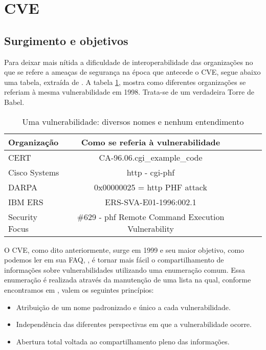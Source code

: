 	\section{CVE}
	\label{sec:cve}

		\subsection{Surgimento e objetivos}
			Para deixar mais nítida a dificuldade de interoperabilidade
			das organizações no que se refere a ameaças de segurança na época
			que antecede o CVE, segue abaixo uma tabela, extraída de \cite{Martin2001}.
			A tabela \ref{tab:torre_babel}, mostra
			como diferentes organizações se referiam à mesma vulnerabilidade
			em 1998. Trata-se de um verdadeira Torre de Babel.

			\begin{table}
				\begin{tabular}{|l|c|c|c|c|}
					\hline
						\textbf{Organização} & \textbf{Como se referia à vulnerabilidade}\\
					\hline
						CERT\footnotemark[1] & CA-96.06.cgi\_example\_code\\
					\hline
						Cisco Systems\footnotemark[2] & http - cgi-phf\\
					\hline
						DARPA & 0x00000025 = http PHF attack\\	
					\hline
						IBM ERS & ERS-SVA-E01-1996:002.1\\	
					\hline
						Security Focus\footnotemark[3] & \#629 - phf Remote Command Execution Vulnerability\\	
					\hline
				\end{tabular}
				\caption{Uma vulnerabilidade: diversos nomes e nenhum entendimento}\label{tab:torre_babel}
			\end{table}
			

			O CVE, como dito anteriormente, surge em 1999 e seu maior objetivo, como podemos
			ler em sua FAQ, \cite{CVE2010}, é tornar mais fácil
			o compartilhamento de informações sobre vulnerabilidades utilizando uma enumeração comum.
			Essa enumeração é realizada através da manutenção de uma lista na qual, conforme
			encontramos em \cite{Santos2004}, valem os seguintes princípios:
			\begin{itemize}
				\item{Atribuição de um nome padronizado e único a cada vulnerabilidade.}
				\item{Independência das diferentes perspectivas em que a vulnerabilidade ocorre.}
				\item{Abertura total voltada ao compartilhamento pleno das informações.}
			\end{itemize}


